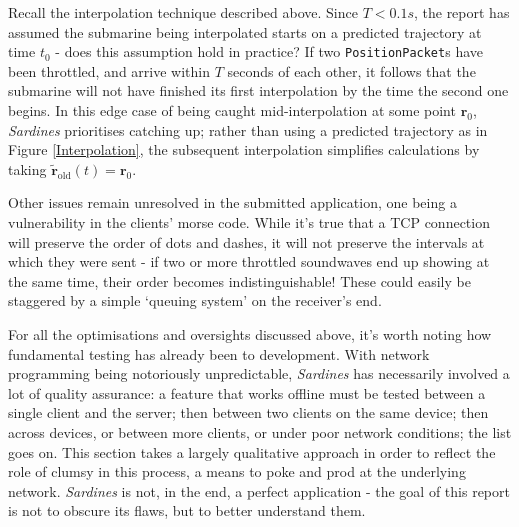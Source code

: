 \documentclass[a4paper, 9pt]{article}
\begin{document}
\begin{flushleft}
\vspace{5pt}\noindent
Recall the interpolation technique described above. Since $T < 0.1s$, the report has assumed the submarine being interpolated starts on a predicted trajectory at time $t_0$ - does this assumption hold in practice? If two \texttt{PositionPacket}s have been throttled, and arrive within $T$ seconds of each other, it follows that the submarine will not have finished its first interpolation by the time the second one begins. In this edge case of being caught mid-interpolation at some point $\mathbf{r}_0$, \textit{Sardines} prioritises catching up; rather than using a predicted trajectory as in Figure \ref{Interpolation}, the subsequent interpolation simplifies calculations by taking $\mathbf{\tilde{r}}_{\textrm{old}}(t) = \mathbf{r}_0$.

\vspace{5pt}\noindent
Other issues remain unresolved in the submitted application, one being a vulnerability in the clients' morse code. While it's true that a TCP connection will preserve the order of dots and dashes, it will not preserve the intervals at which they were sent - if two or more throttled soundwaves end up showing at the same time, their order becomes indistinguishable! These could easily be staggered by a simple `queuing system' on the receiver's end.

\vspace{5pt}\noindent
For all the optimisations and oversights discussed above, it's worth noting how fundamental testing has already been to development. With network programming being notoriously unpredictable, \textit{Sardines} has necessarily involved a lot of quality assurance: a feature that works offline must be tested between a single client and the server; then between two clients on the same device; then across devices, or between more clients, or under poor network conditions; the list goes on. This section takes a largely qualitative approach in order to reflect the role of clumsy in this process, a means to poke and prod at the underlying network. \textit{Sardines} is not, in the end, a perfect application - the goal of this report is not to obscure its flaws, but to better understand them.



\end{flushleft}
\end{document}
